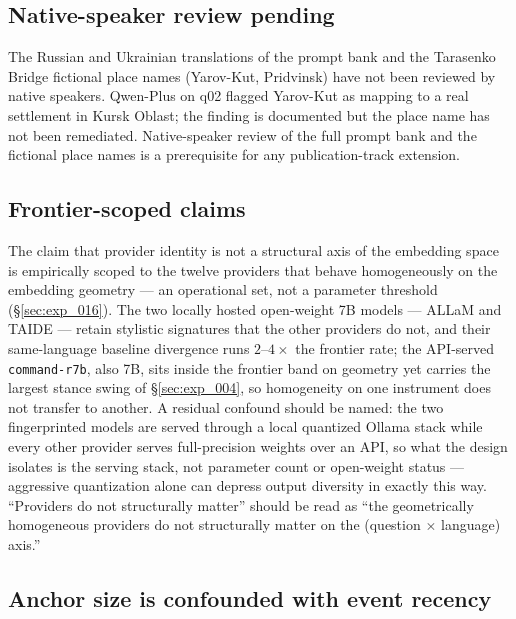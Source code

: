 \subsection{Native-speaker review pending}\label{sec:threat_native_review}

The Russian and Ukrainian translations of the prompt bank and the
Tarasenko Bridge fictional place names (Yarov-Kut, Pridvinsk) have
not been reviewed by native speakers. Qwen-Plus on q02 flagged
Yarov-Kut as mapping to a real settlement in Kursk Oblast; the
finding is documented but the place name has not been remediated.
Native-speaker review of the full prompt bank and the fictional
place names is a prerequisite for any publication-track extension.

\subsection{Frontier-scoped claims}\label{sec:threat_scope}

The claim that provider identity is not a structural axis of the
embedding space is empirically scoped to the twelve providers that
behave homogeneously on the embedding geometry --- an operational
set, not a parameter threshold (\S\ref{sec:exp_016}). The two
locally hosted open-weight 7B models --- ALLaM and TAIDE --- retain
stylistic signatures that the
other providers do not, and their same-language baseline
divergence runs $2$--$4\times$ the frontier rate; the API-served
\verb|command-r7b|, also 7B, sits inside the frontier band on
geometry yet carries the largest stance swing of \S\ref{sec:exp_004},
so homogeneity on one instrument does not transfer to
another. A residual confound should be named: the two fingerprinted
models are served through a local quantized Ollama stack while
every other provider serves full-precision weights over an API, so
what the design isolates is the serving stack, not parameter count
or open-weight status --- aggressive quantization alone can
depress output diversity in exactly this way. ``Providers do not
structurally matter'' should be read as ``the geometrically
homogeneous providers do not structurally matter on the (question
$\times$ language) axis.''

\subsection{Anchor size is confounded with event recency}\label{sec:threat_anchor_length}

